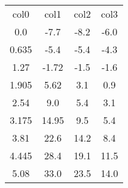 \begin{table}
\begin{tabular}{cccc}
col0 & col1 & col2 & col3 \\
0.0 & -7.7 & -8.2 & -6.0 \\
0.635 & -5.4 & -5.4 & -4.3 \\
1.27 & -1.72 & -1.5 & -1.6 \\
1.905 & 5.62 & 3.1 & 0.9 \\
2.54 & 9.0 & 5.4 & 3.1 \\
3.175 & 14.95 & 9.5 & 5.4 \\
3.81 & 22.6 & 14.2 & 8.4 \\
4.445 & 28.4 & 19.1 & 11.5 \\
5.08 & 33.0 & 23.5 & 14.0 \\
\end{tabular}
\end{table}
